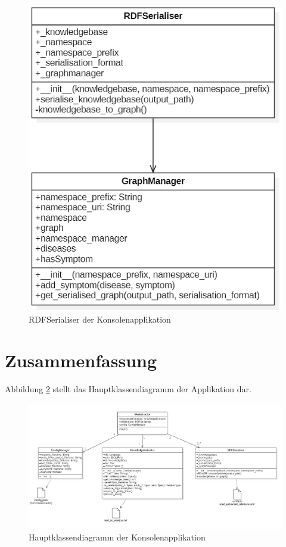 \begin{figure}[h]
    \centering
    \includegraphics[width=\textwidth]{pictures/RDFSerialiser.png}
    \caption{RDFSerialiser der Konsolenapplikation}
    \label{fig:RDFSerialiser}
\end{figure}


\section{Zusammenfassung}
\label{sec:zusammenfassung modellierung} 

Abbildung \ref{fig:mainClassDiagram} stellt das Hauptklassendiagramm der Applikation dar.

\begin{figure}[h]
    \centering
    \includegraphics[width=\textwidth]{pictures/Main.png}
    \caption{Hauptklassendiagramm der Konsolenapplikation}
    \label{fig:mainClassDiagram}
\end{figure}